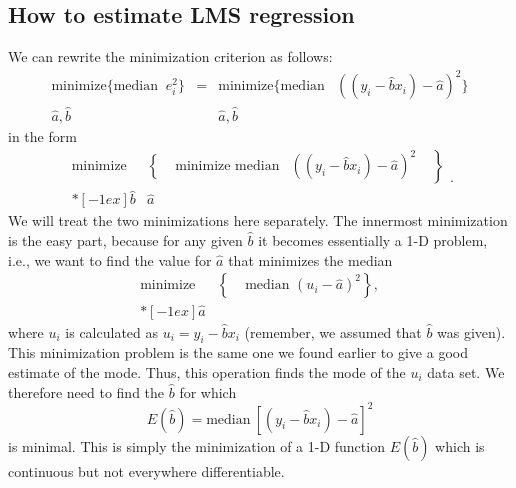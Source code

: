 
\subsection{How to estimate LMS regression}

We can rewrite the minimization criterion as follows:
\begin{equation}
\begin{array}{cccc}
\mbox{minimize} \{ \mbox{median } \ e^2_i \}& = & \mbox{minimize} \{  \mbox{median} & ((y_i - \hat{b} x_i) - \hat{a})^2\} \\
\hat{a}, \hat{b} & & \hat{a}, \hat{b} & \end{array}
\end{equation}	 	
in the form
\begin{equation}
\begin{array}{ccc}
\mbox{minimize} \! \!  & \! \! \! \left \{ \! \! \! \phantom{\displaystyle \frac{\sum }{\ }} \! \!\! \mbox{minimize median} \right. & \! \! \! \left. (( y_i - \hat{b}x_i) - \hat{a})^2 \! \! \!\phantom{\displaystyle \frac{\sum }{\ }}\! \! \! \right \}\\*[-1ex]
\hat{b} & \hat{a} & \end{array} .
\end{equation}	 	
We will treat the two minimizations here separately.  The innermost minimization is the easy part, 
because for any given $\hat{b}$ it becomes essentially a 1-D problem, i.e., we want to find the value for $\hat{a}$ that 
minimizes the median
\begin{equation}
\begin{array}{cc}
\mbox{minimize} \! \! & \! \! \!  \left \{ \phantom{\displaystyle \frac{\sum }{\ }} \! \! \! \! \! \mbox{median } (u_i - \hat{a})^2 \right \}, \\*[-1ex]
\hat{a} & \end{array}
\end{equation}
where $u_i$ is calculated as $u_i = y_i - \hat{b} x_i$ (remember, we assumed that $\hat{b}$ was given).  This minimization problem is 
the same one we found earlier to give a good estimate of the mode.  Thus, this operation finds the mode 
of the $u_i$ data set.  We therefore need to find the $\hat{b}$ for which
\begin{equation}
E (\hat{b}) = \mbox{median} \ [(y_i - \hat{b}x_i) - \hat{a}]^2
\end{equation}	 
is minimal.  This is simply the minimization of a 1-D function $E(\hat{b})$ which is continuous but 
not everywhere differentiable.

